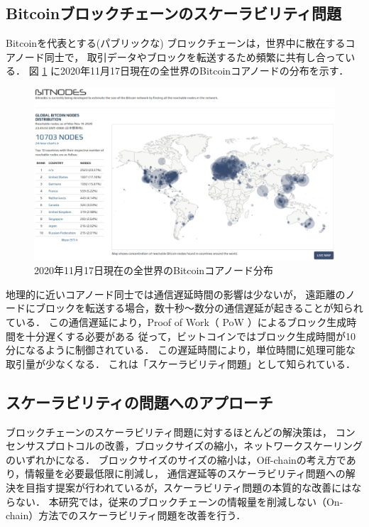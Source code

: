 \documentclass[a4paper,12pt]{jsarticle}
\begin{document}
\subsection*{Bitcoinブロックチェーンのスケーラビリティ問題}
Bitcoinを代表とする(パブリックな) ブロックチェーンは，世界中に散在するコアノード同士で，
取引データやブロックを転送するため頻繁に共有し合っている．
図 \ref{fig:bitnodes} に2020年11月17日現在の全世界のBitcoinコアノードの分布を示す．

\begin{figure}[H]%
  \begin{center}
    \includegraphics[width=130mm]{pht/bitnodes1117.eps}
  \end{center}
  \caption{2020年11月17日現在の全世界のBitcoinコアノード分布}
  \label{fig:bitnodes}
\end{figure}

地理的に近いコアノード同士では通信遅延時間の影響は少ないが，
遠距離のノードにブロックを転送する場合，数十秒〜数分の通信遅延が起きることが知られている．
この通信遅延により，Proof of Work（ PoW ）によるブロック生成時間を十分遅くする必要がある
従って，ビットコインではブロック生成時間が10分になるように制御されている．
この遅延時間により，単位時間に処理可能な取引量が少なくなる．
これは「スケーラビリティ問題」として知られている． 

\subsection*{スケーラビリティの問題へのアプローチ}
ブロックチェーンのスケーラビリティ問題に対するほとんどの解決策は，
コンセンサスプロトコルの改善，ブロックサイズの縮小，ネットワークスケーリングのいずれかになる．
ブロックサイズのサイズの縮小は，Off-chainの考え方であり，情報量を必要最低限に削減し，
通信遅延等のスケーラビリティ問題への解決を目指す提案が行われているが，スケーラビリティ問題の本質的な改善にはならない．
本研究では，従来のブロックチェーンの情報量を削減しない（On-chain）方法でのスケーラビリティ問題を改善を行う．
\end{document}
